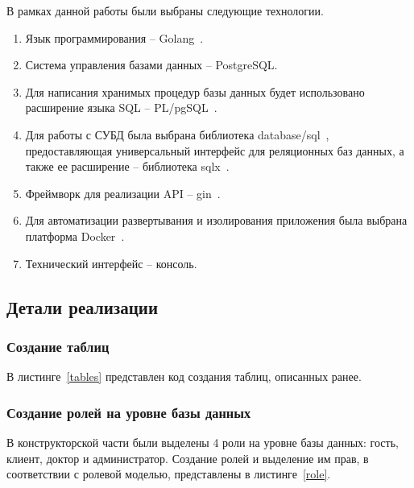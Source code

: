 В рамках данной работы были выбраны следующие технологии.
\begin{enumerate}[label=\arabic*)]
	\item Язык программирования -- Golang~\cite{go}.
	\item Система управления базами данных -- PostgreSQL. 
	\item Для написания хранимых процедур базы данных будет использовано расширение языка SQL -- PL/pgSQL~\cite{pgSQL}.
	\item Для работы с СУБД была выбрана библиотека database/sql~\cite{go-sql}, предоставляющая универсальный интерфейс для реляционных баз данных, а также ее расширение -- библиотека sqlx~\cite{sqlx}.
	\item Фреймворк для реализации API -- gin~\cite{gin}.
	\item Для автоматизации развертывания и изолирования приложения была выбрана платформа Docker~\cite{docker}. 
	\item Технический интерфейс -- консоль. 
\end{enumerate}

\subsection{Детали реализации}

\subsubsection{Создание таблиц}

В листинге~\ref{tables} представлен код создания таблиц, описанных ранее.


\subsubsection{Создание ролей на уровне базы данных}

В конструкторской части были выделены 4 роли на уровне базы данных: гость, клиент, доктор и администратор. Создание ролей и выделение им прав, в соответствии с ролевой моделью, представлены в листинге~\ref{role}. 


